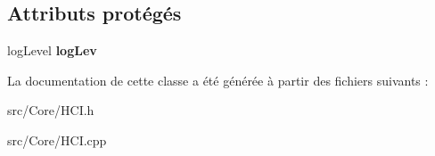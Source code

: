 \subsection*{Attributs protégés}
\begin{DoxyCompactItemize}
\item 
\hypertarget{classHCI_ac344060f03fa9aa1809cfecb507a83f9}{log\-Level {\bfseries log\-Lev}}\label{classHCI_ac344060f03fa9aa1809cfecb507a83f9}

\end{DoxyCompactItemize}


La documentation de cette classe a été générée à partir des fichiers suivants \-:\begin{DoxyCompactItemize}
\item 
src/\-Core/H\-C\-I.\-h\item 
src/\-Core/H\-C\-I.\-cpp\end{DoxyCompactItemize}
